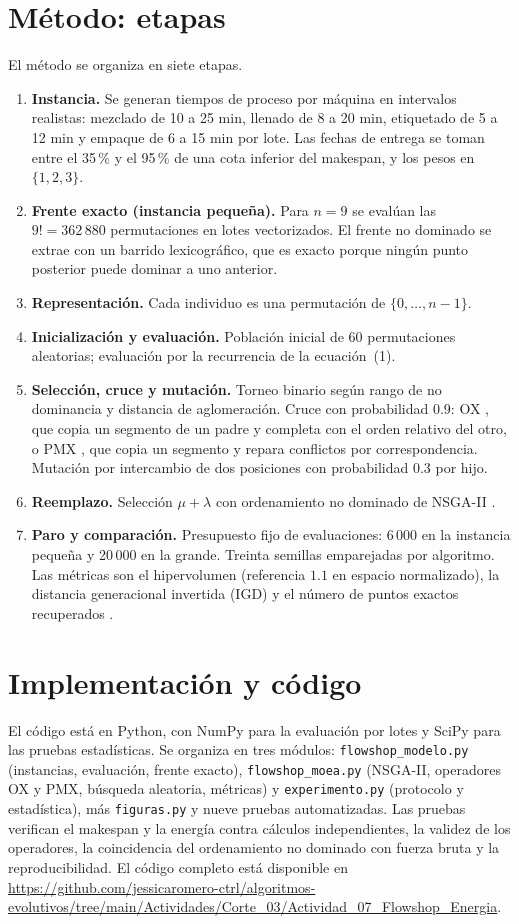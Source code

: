 \documentclass[11pt,a4paper]{article}
\newcommand{\CODIGO}{\url{https://github.com/jessicaromero-ctrl/algoritmos-evolutivos/tree/main/Actividades/Corte_03/Actividad_07_Flowshop_Energia}}
\begin{document}
\section{Método: etapas}
El método se organiza en siete etapas.
\begin{enumerate}[leftmargin=2em]
\item \textbf{Instancia.} Se generan tiempos de proceso por máquina en intervalos realistas: mezclado de 10 a 25 min, llenado de 8 a 20 min, etiquetado de 5 a 12 min y empaque de 6 a 15 min por lote. Las fechas de entrega se toman entre el 35\,\% y el 95\,\% de una cota inferior del makespan, y los pesos en $\{1,2,3\}$.
\item \textbf{Frente exacto (instancia pequeña).} Para $n=9$ se evalúan las $9!=362\,880$ permutaciones en lotes vectorizados. El frente no dominado se extrae con un barrido lexicográfico, que es exacto porque ningún punto posterior puede dominar a uno anterior.
\item \textbf{Representación.} Cada individuo es una permutación de $\{0,\dots,n-1\}$.
\item \textbf{Inicialización y evaluación.} Población inicial de 60 permutaciones aleatorias; evaluación por la recurrencia de la ecuación~(1).
\item \textbf{Selección, cruce y mutación.} Torneo binario según rango de no dominancia y distancia de aglomeración. Cruce con probabilidad 0.9: OX \cite{davis1985}, que copia un segmento de un padre y completa con el orden relativo del otro, o PMX \cite{goldberg1985}, que copia un segmento y repara conflictos por correspondencia. Mutación por intercambio de dos posiciones con probabilidad 0.3 por hijo.
\item \textbf{Reemplazo.} Selección $\mu+\lambda$ con ordenamiento no dominado de NSGA-II \cite{deb2002}.
\item \textbf{Paro y comparación.} Presupuesto fijo de evaluaciones: 6\,000 en la instancia pequeña y 20\,000 en la grande. Treinta semillas emparejadas por algoritmo. Las métricas son el hipervolumen (referencia $1.1$ en espacio normalizado), la distancia generacional invertida (IGD) y el número de puntos exactos recuperados \cite{zitzler1999,coello2007}.
\end{enumerate}

\section{Implementación y código}
El código está en Python, con NumPy para la evaluación por lotes y SciPy para las pruebas estadísticas. Se organiza en tres módulos: \texttt{flowshop\_modelo.py} (instancias, evaluación, frente exacto), \texttt{flowshop\_moea.py} (NSGA-II, operadores OX y PMX, búsqueda aleatoria, métricas) y \texttt{experimento.py} (protocolo y estadística), más \texttt{figuras.py} y nueve pruebas automatizadas. Las pruebas verifican el makespan y la energía contra cálculos independientes, la validez de los operadores, la coincidencia del ordenamiento no dominado con fuerza bruta y la reproducibilidad. El código completo está disponible en \CODIGO.
\end{document}
